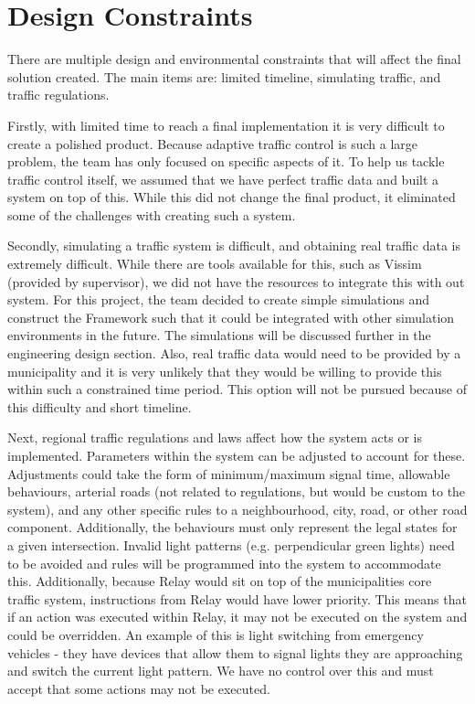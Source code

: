 \documentclass{report}
\begin{document}
\section{Design Constraints}
There are multiple design and environmental constraints that will affect the final solution created.
The main items are: limited timeline, simulating traffic, and traffic regulations.

Firstly, with limited time to reach a final implementation it is very difficult to create a polished product.
Because adaptive traffic control is such a large problem, the team has only focused on specific aspects of it.
To help us tackle traffic control itself, we assumed that we have perfect traffic data and built a system on top of this.
While this did not change the final product, it eliminated some of the challenges with creating such a system.

Secondly, simulating a traffic system is difficult, and obtaining real traffic data is extremely difficult.
While there are tools available for this, such as Vissim (provided by supervisor), we did not have the resources to integrate this with out system.
For this project, the team decided to create simple simulations and construct the Framework such that it could be integrated with other simulation environments in the future.
The simulations will be discussed further in the engineering design section.
Also, real traffic data would need to be provided by a municipality and it is very unlikely that they would be willing to provide this within such a constrained time period.
This option will not be pursued because of this difficulty and short timeline.

Next, regional traffic regulations and laws affect how the system acts or is implemented.
Parameters within the system can be adjusted to account for these.
Adjustments could take the form of minimum/maximum signal time, allowable behaviours, arterial roads (not related to regulations, but would be custom to the system), and any other specific rules to a neighbourhood, city, road, or other road component.
Additionally, the behaviours must only represent the legal states for a given intersection.
Invalid light patterns (e.g. perpendicular green lights) need to be avoided and rules will be programmed into the system to accommodate this.
Additionally, because Relay would sit on top of the municipalities core traffic system, instructions from Relay would have lower priority.
This means that if an action was executed within Relay, it may not be executed on the system and could be overridden.
An example of this is light switching from emergency vehicles - they have devices that allow them to signal lights they are approaching and switch the current light pattern.
We have no control over this and must accept that some actions may not be executed.
\end{document}
